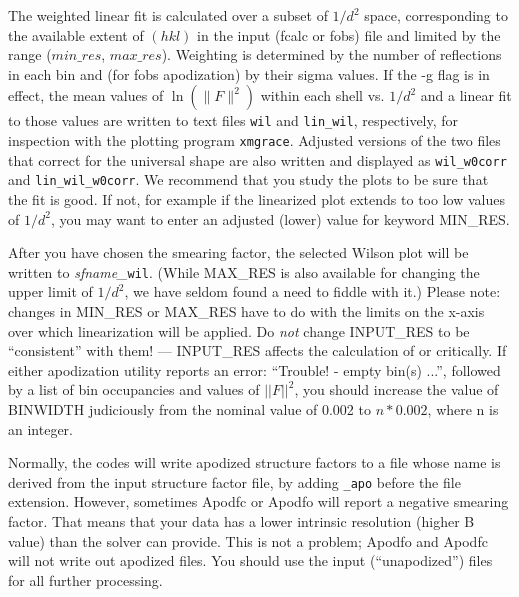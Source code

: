 \documentclass{report}
\begin{document}
{The weighted linear fit is calculated over a subset of $1/d^2$ space, 
corresponding to the available extent of $(h k l)$ in the input 
(fcalc or fobs) file and limited by the range ($min\_res$, $max\_res$).
Weighting is determined by the number of reflections in each bin and 
(for fobs apodization) by their sigma values.
If the -g flag is in effect, the mean values of $\ln(\|F\|^2)$ within each shell
vs. $1/d^2$ and a linear fit to those
values are written to text files {\tt wil} and {\tt lin\_wil}, respectively, 
for inspection with the plotting program {\tt xmgrace}.
Adjusted versions of the two files that correct for the universal shape
are also written and displayed as {\tt wil\_w0corr} and {\tt lin\_wil\_w0corr}. 
We recommend that you study the plots to be sure that the fit is good.  
If not, for example if the linearized plot extends to too low 
values of $1/d^2$, you may
want to enter an adjusted (lower) value for keyword 
MIN\_RES.

After you have chosen the smearing factor, the selected Wilson 
plot will be written to {\it sfname\_}{\tt wil}.  
(While MAX\_RES
 is also available for changing the upper limit of $1/d^2$, 
we have seldom found a need to fiddle with it.)
Please note: changes in MIN\_RES
 or MAX\_RES
 have to do with 
the limits on the x-axis over which linearization will be applied.  Do {\em not}
change INPUT\_RES  to be ``consistent'' 
with them! --- INPUT\_RES affects the calculation of \delfo or \delfc 
critically.  If either apodization utility
reports an error: ``Trouble! - empty bin(s) ...'', 
followed by a list of bin occupancies and values of $||F||^2$,
you should increase the value of BINWIDTH 
judiciously from the nominal value of 0.002 to $n*0.002$, where n is an integer.

\vspace {0.1in}

Normally, the codes will write apodized structure factors 
to a file whose name is derived from the input structure factor file, 
by adding {\tt \_apo} before the file extension.  
However, sometimes Apodfc or Apodfo will report a negative smearing factor.
That means that your data has a lower intrinsic resolution (higher B value)
than the solver can provide.  This is not a problem; 
Apodfo and Apodfc will not write out apodized files.  You should use the
input (``unapodized'') files for all further processing.   

}
\end{document}
